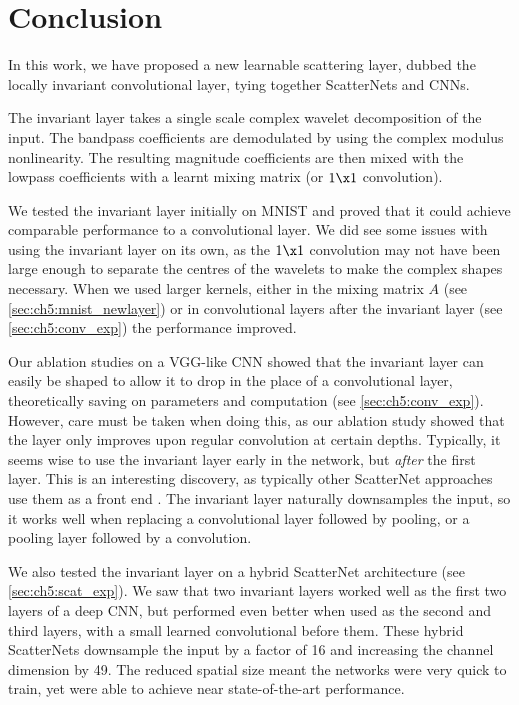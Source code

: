 \section{Conclusion}\label{sec:ch5:conclusion}
In this work, we have proposed a new learnable scattering layer, dubbed the
locally invariant convolutional layer, tying together ScatterNets and CNNs.

The invariant layer takes a single scale complex wavelet decomposition of the
input. The bandpass coefficients are demodulated by using the complex modulus
nonlinearity. The resulting magnitude coefficients are then mixed with the
lowpass coefficients with a learnt mixing matrix (or $1\x 1$ convolution). 

We tested the invariant layer initially on MNIST and proved that it could
achieve comparable performance to a convolutional layer.
We did see some issues with using the invariant layer on its own, as the $1\x 1$
convolution may not have been large enough to separate the centres of the
wavelets to make the complex shapes necessary. When we used larger kernels,
either in the mixing matrix $A$ (see \autoref{sec:ch5:mnist_newlayer}) or in
convolutional layers after the invariant layer (see \autoref{sec:ch5:conv_exp})
the performance improved.

Our ablation studies on a VGG-like CNN showed that the invariant layer can
easily be shaped to allow it to drop in the place of a convolutional layer,
theoretically saving on parameters and computation (see \autoref{sec:ch5:conv_exp}).
However, care must be taken when doing this, as our ablation study showed that
the layer only improves upon regular convolution at certain depths. Typically,
it seems wise to use the invariant layer early in the network, but \emph{after} the
first layer. This is an interesting discovery, as typically other ScatterNet
approaches use them as a front end \cite{oyallon_scaling_2017, singh_scatternet_2017}. 
The invariant layer naturally
downsamples the input, so it works well when replacing a convolutional layer
followed by pooling, or a pooling layer followed by a convolution. 

We also tested the invariant layer on a hybrid ScatterNet architecture (see
\autoref{sec:ch5:scat_exp}). We saw that two invariant layers worked well as the
first two layers of a deep CNN, but performed even better when used as the
second and third layers, with a small learned convolutional before them. These
hybrid ScatterNets downsample the input by a factor of 16 and increasing the
channel dimension by 49. The reduced spatial size meant the networks were very
quick to train, yet were able to achieve near state-of-the-art performance.


